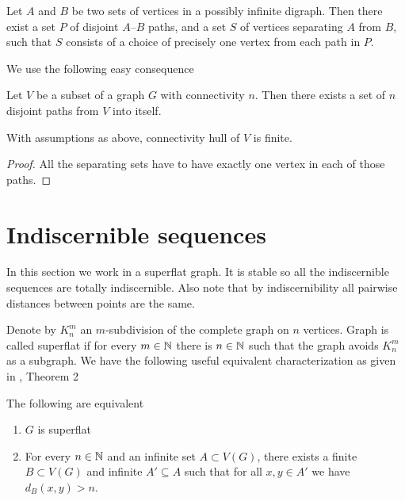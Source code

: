 \documentclass{amsart}
\begin{document}
\begin{Theorem} 
	Let $A$ and $B$ be two sets of vertices in a possibly infinite digraph. Then there exist a set $P$ of disjoint $A–B$ paths, and a set $S$ of vertices separating $A$ from $B$, such that $S$ consists of a choice of precisely one vertex from each path in $P$.
\end{Theorem}

We use the following easy consequence

\begin{Corollary}
	Let $V$ be a subset of a graph $G$ with connectivity $n$. Then there exists a set of $n$ disjoint paths from $V$ into itself.
\end{Corollary}

\begin{Corollary}
	With assumptions as above, connectivity hull of $V$ is finite.
\end{Corollary}

\begin{proof}
	All the separating sets have to have exactly one vertex in each of those paths. 
\end{proof}

\section{Indiscernible sequences}

In this section we work in a superflat graph. It is stable so all the indiscernible sequences are totally indiscernible. Also note that by indiscernibility all pairwise distances between points are the same.

Denote by $K^m_n$ an $m$-subdivision of the complete graph on $n$ vertices. Graph is called superflat if for every $m \in \mathbb{N}$ there is $n \in \mathbb{N}$ such that the graph avoids $K^m_n$ as a subgraph. We have the following useful equivalent characterization as given in \cite{stable_graphs}, Theorem 2

\begin{Theorem}
	The following are equivalent
	\begin{enumerate}
		\item $G$ is superflat
		\item For every $n \in \mathbb{N}$ and an infinite set $A \subset V(G)$, there exists a finite $B \subset V(G)$ and infinite $A' \subseteq A$ such that for all $x,y \in A'$ we have $d_{B}(x, y) > n$.
	\end{enumerate}
\end{Theorem}
\end{document}
